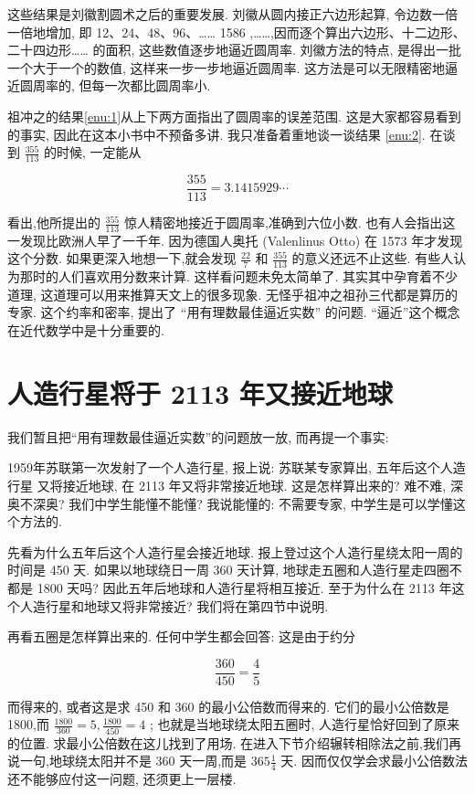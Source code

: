 \documentclass{ctexart}
\begin{document}
这些结果是刘徽割圆术之后的重要发展. 刘徽从圆内接正六边形起算, 令边数一倍一倍地增加, 即 12、24、48、96、…… 1586 ,……,因而逐个算出六边形、十二边形、二十四边形…… 的面积, 这些数值逐步地逼近圆周率. 刘徽方法的特点, 是得出一批一个大于一个的数值, 这样来一步一步地逼近圆周率. 这方法是可以无限精密地逼近圆周率的, 但每一次都比圆周率小.

祖冲之的结果\ref{enu:1}从上下两方面指出了圆周率的误差范围. 这是大家都容易看到的事实, 因此在这本小书中不预备多讲. 我只准备着重地谈一谈结果 \ref{enu:2}. 在谈到 \(\frac{355}{113}\) 的时候, 一定能从

\[
\frac{355}{113} = {3.1415929}\cdots
\]

看出,他所提出的 \(\frac{355}{113}\) 惊人精密地接近于圆周率,准确到六位小数. 也有人会指出这一发现比欧洲人早了一千年. 因为德国人奥托 (Valenlinus Otto) 在 1573 年才发现这个分数. 如果更深入地想一下,就会发现 \(\frac{22}{7}\) 和 \(\frac{355}{113}\) 的意义还远不止这些. 有些人认为那时的人们喜欢用分数来计算. 这样看问题未免太简单了. 其实其中孕育着不少道理, 这道理可以用来推算天文上的很多现象. 无怪乎祖冲之祖孙三代都是算历的专家. 这个约率和密率, 提出了 “用有理数最佳逼近实数” 的问题. “逼近”这个概念在近代数学中是十分重要的.

\section{人造行星将于 2113 年又接近地球}

我们暂且把“用有理数最佳逼近实数”的问题放一放, 而再提一个事实:

1959年苏联第一次发射了一个人造行星, 报上说: 苏联某专家算出, 五年后这个人造行星 又将接近地球, 在 2113 年又将非常接近地球. 这是怎样算出来的? 难不难, 深奥不深奥? 我们中学生能懂不能懂? 我说能懂的: 不需要专家, 中学生是可以学懂这个方法的.

先看为什么五年后这个人造行星会接近地球. 报上登过这个人造行星绕太阳一周的时间是 450 天. 如果以地球绕日一周 360 天计算, 地球走五圈和人造行星走四圈不都是 1800 天吗? 因此五年后地球和人造行星将相互接近. 至于为什么在 2113 年这个人造行星和地球又将非常接近? 我们将在第四节中说明.

再看五圈是怎样算出来的. 任何中学生都会回答: 这是由于约分

\[
\frac{360}{450} = \frac{4}{5}
\]

而得来的, 或者这是求 450 和 360 的最小公倍数而得来的. 它们的最小公倍数是 1800,而 \(\frac{1800}{360} = 5,\frac{1800}{450} = 4\) ; 也就是当地球绕太阳五圈时, 人造行星恰好回到了原来的位置. 求最小公倍数在这儿找到了用场. 在进入下节介绍辗转相除法之前,我们再说一句,地球绕太阳并不是 360 天一周,而是 \({365}\frac{1}{4}\) 天. 因而仅仅学会求最小公倍数法还不能够应付这一问题, 还须更上一层楼.
\end{document}

